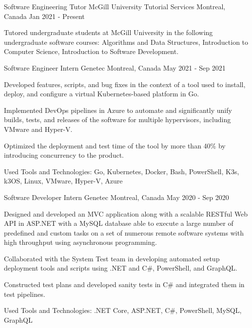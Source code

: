 
\begin{cventries}
    \cventry
    {Software Engineering Tutor} %
    { McGill University Tutorial Services} %
    {Montreal, Canada} %
    {Jan 2021 - Present} %
    {
      \begin{cvitems} %
        \item {Tutored undergraduate students at McGill University in the following undergraduate software courses: Algorithms and Data Structures, Introduction to Computer Science, Introduction to Software Development.}
      \end{cvitems}
    }
    
  \cventry
    {Software Engineer Intern} %
    {Genetec} %
    {Montreal, Canada} %
    {May 2021 - Sep 2021} %
    {
      \begin{cvitems} %
        \item {Developed features, scripts, and bug fixes in the context of a tool used to install, deploy, and configure a virtual Kubernetes-based platform in Go.}
        \item{Implemented DevOps pipelines in Azure to automate and significantly unify builds, tests, and releases of the software for multiple hypervisors, including VMware and Hyper-V.}
        \item{Optimized the deployment and test time of the tool by more than 40\% by introducing concurrency to the product.}
        \item{Used Tools and Technologies: Go, Kubernetes, Docker, Bash, PowerShell, K3s, k3OS, Linux, VMware, Hyper-V, Azure}
      \end{cvitems}
    }
    
    \cventry
    {Software Developer Intern} %
    {Genetec} %
    {Montreal, Canada} %
    {May 2020 - Sep 2020} %
    {
      \begin{cvitems} %
        \item {Designed and developed an MVC application along with a scalable RESTful Web API in ASP.NET with a MySQL database able to execute a large number of predefined and custom tasks on a set of numerous remote software systems with high throughput using asynchronous programming.}
        \item{Collaborated with the System Test team in developing automated setup deployment tools and scripts using .NET and C\#, PowerShell, and GraphQL.}
        \item{Constructed test plans and developed sanity tests in C\# and integrated them in test pipelines.}
        \item{Used Tools and Technologies: .NET Core, ASP.NET, C\#, PowerShell, MySQL, GraphQL}
      \end{cvitems}
    }
\end{cventries}
